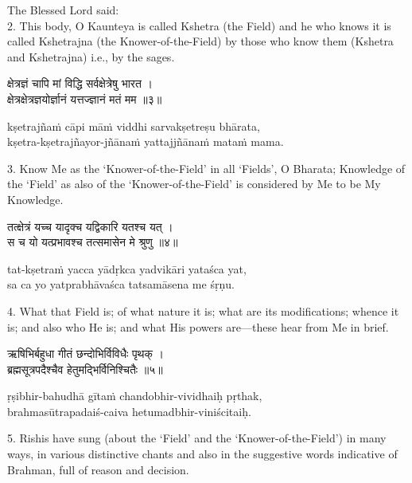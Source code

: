 The Blessed Lord said: \\
2. This body, O Kaunteya is called Kshetra (the Field) and he who knows it is
called Kshetrajna (the Knower-of-the-Field) by those who know them (Kshetra and
Kshetrajna) i.e., by the sages.

\begin{gitaverse}
क्षेत्रज्ञं चापि मां विद्धि सर्वक्षेत्रेषु भारत । \\
क्षेत्रक्षेत्रज्ञयोर्ज्ञानं यत्तज्ज्ञानं मतं मम ॥३॥
\end{gitaverse}

\begin{transliteration}
kṣetrajñaṁ cāpi māṁ viddhi sarvakṣetreṣu bhārata, \\
kṣetra-kṣetrajñayor-jñānaṁ yattajjñānaṁ mataṁ mama.
\end{transliteration}

3. Know Me as the `Knower-of-the-Field' in all `Fields', O Bharata; Knowledge
of the `Field' as also of the `Knower-of-the-Field' is considered by Me to be
My Knowledge.

\begin{gitaverse}
तत्क्षेत्रं यच्च यादृक्च यद्विकारि यतश्च यत् । \\
स च यो यत्प्रभावश्च तत्समासेन मे श्रुणु ॥४॥
\end{gitaverse}

\begin{transliteration}
tat-kṣetraṁ yacca yādṛkca yadvikāri yataśca yat, \\
sa ca yo yatprabhāvaśca tatsamāsena me śṛṇu.
\end{transliteration}

4. What that Field is; of what nature it is; what are its modifications; whence
it is; and also who He is; and what His powers are---these hear from Me in
brief.

\begin{gitaverse}
ऋषिभिर्बहुधा गीतं छन्दोभिर्विविधैः पृथक् । \\
ब्रह्मसूत्रपदैश्चैव हेतुमद्भिर्विनिश्चितैः ॥५॥
\end{gitaverse}

\begin{transliteration}
ṛṣibhir-bahudhā gītaṁ chandobhir-vividhaiḥ pṛthak, \\
brahmasūtrapadaiś-caiva hetumadbhir-viniścitaiḥ.
\end{transliteration}

5. Rishis have sung (about the `Field' and the `Knower-of-the-Field') in many
ways, in various distinctive chants and also in the suggestive words indicative
of Brahman, full of reason and decision.

